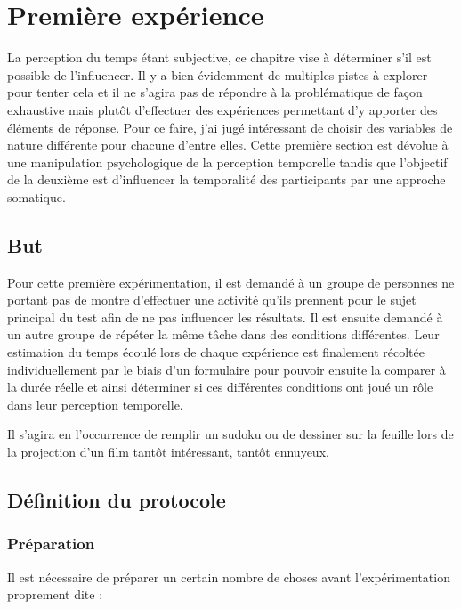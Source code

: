 \documentclass[12pt,fleqn,oneside,french,openany]{book} %
\begin{document}
\section{Première expérience} \label{sec:exp1}
La perception du temps étant subjective, ce chapitre vise à déterminer s'il est possible de l'influencer. Il y a bien évidemment de multiples pistes à explorer pour tenter cela et il ne s'agira pas de répondre à la problématique de façon exhaustive mais plutôt d'effectuer des expériences permettant d'y apporter des éléments de réponse. Pour ce faire, j'ai jugé intéressant de choisir des variables de nature différente pour chacune d'entre elles. Cette première section est dévolue à une manipulation psychologique de la perception temporelle tandis que l'objectif de la deuxième est d'influencer la temporalité des participants par une approche somatique.

\subsection{But} \label{ssec:but1}
Pour cette première expérimentation, il est demandé à un groupe de personnes ne portant pas de montre d'effectuer une activité qu'ils prennent pour le sujet principal du test afin de ne pas influencer les résultats. Il est ensuite demandé à un autre groupe de répéter la même tâche dans des conditions différentes. Leur estimation du temps écoulé lors de chaque expérience est finalement récoltée individuellement par le biais d'un formulaire pour pouvoir ensuite la comparer à la durée réelle et ainsi déterminer si ces différentes conditions ont joué un rôle dans leur perception temporelle.

Il s'agira en l'occurrence de remplir un sudoku ou de dessiner sur la feuille lors de la projection d'un film tantôt intéressant, tantôt ennuyeux.


\subsection{Définition du protocole} \label{ssec:defProto1}

\subsubsection{Préparation} \label{sssec:preparation1}
Il est nécessaire de préparer un certain nombre de choses avant l'expérimentation proprement dite :
\end{document}
